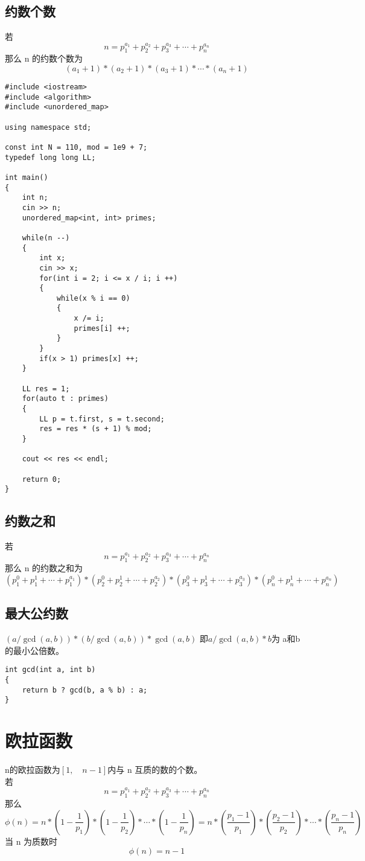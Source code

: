 \documentclass[]{book}
\begin{document}
\section{约数个数}
若 
\[n = p_{1}^{a_{1}} + p_{2}^{a_{2}} + p_{3}^{a_{3}} +\cdots+ p_{n}^{a_{n}}\]
那么 n 的约数个数为
\[(a_{1} + 1) * (a_{2} + 1) * (a_{3} + 1) *\cdots* (a_{n} + 1)\]
\begin{lstlisting}
#include <iostream>
#include <algorithm>
#include <unordered_map>

using namespace std;

const int N = 110, mod = 1e9 + 7;
typedef long long LL;

int main()
{
    int n;
    cin >> n;
    unordered_map<int, int> primes;
    
    while(n --)
    {
        int x;
        cin >> x;
        for(int i = 2; i <= x / i; i ++)
        {
            while(x % i == 0)
            {
                x /= i;
                primes[i] ++;
            }
        }
        if(x > 1) primes[x] ++;
    }
    
    LL res = 1;
    for(auto t : primes)
    {
        LL p = t.first, s = t.second;
        res = res * (s + 1) % mod;
    }
    
    cout << res << endl;
    
    return 0;
}
\end{lstlisting}
\section{约数之和}
若
\[n = p_{1}^{a_{1}} + p_{2}^{a_{2}} + p_{3}^{a_{3}} +\cdots+ p_{n}^{a_{n}}\]
那么 n 的约数之和为
\[(p_{1}^{0} + p_{1}^{1} + \cdots + p_{1}^{a_{1}}) * (p_{2}^{0} + p_{2}^{1} + \cdots + p_{2}^{a_{2}}) * (p_{3}^{0} + p_{3}^{1} + \cdots + p_{3}^{a_{3}}) * (p_{n}^{0} + p_{n}^{1} + \cdots + p_{n}^{a_{n}})\]
\section{最大公约数}
$(a / \gcd(a, b)) * (b / \gcd(a, b))* \gcd(a, b)$ 即$a / \gcd(a, b) * b$为 a和b 的最小公倍数。
\begin{lstlisting}
int gcd(int a, int b)
{
    return b ? gcd(b, a % b) : a;
}
\end{lstlisting}
\chapter{欧拉函数}
n的欧拉函数为$[1,\quad n - 1]$内与 n 互质的数的个数。\\
若 
\[n = p_{1}^{a_{1}} + p_{2}^{a_{2}} + p_{3}^{a_{3}} +\cdots + p_{n}^{a_{n}}\]
那么
\[\phi(n) = n * (1 - \frac{1}{p_{1}}) * (1 - \frac{1}{p_{2}}) *\cdots* (1 - \frac{1}{p_{n}}) = 
n*(\frac{p_{1} - 1}{p_{1}})*(\frac{p_{2} - 1}{p_{2}})*\cdots *(\frac{p_{n} - 1}{p_{n}})\]
当 n 为质数时
\[\phi(n) = n - 1\]
\end{document}
